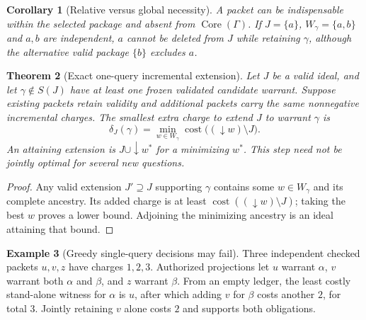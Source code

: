 \documentclass[10pt,letterpaper]{article}
\newtheorem{theorem}{Theorem}[section]
\newtheorem{corollary}[theorem]{Corollary}
\theoremstyle{definition}
\newtheorem{example}[theorem]{Example}
\theoremstyle{remark}
\newcommand{\cost}{\operatorname{cost}}
\newcommand{\Core}{\operatorname{Core}}
\begin{document}
\begin{corollary}[Relative versus global necessity]
A packet can be indispensable within the selected package and absent from $\Core(\Gamma)$. If $J=\{a\}$, $W_\gamma=\{a,b\}$ and $a,b$ are independent, $a$ cannot be deleted from $J$ while retaining $\gamma$, although the alternative valid package $\{b\}$ excludes $a$.
\end{corollary}

\begin{theorem}[Exact one-query incremental extension]\label{thm:increment}
Let $J$ be a valid ideal, and let $\gamma\notin S(J)$ have at least one frozen validated candidate warrant. Suppose existing packets retain validity and additional packets carry the same nonnegative incremental charges. The smallest extra charge to extend $J$ to warrant $\gamma$ is
\begin{equation}\label{eq:increment}
\delta_J(\gamma)=\min_{w\in W_\gamma}\cost\bigl((\downarrow w)\setminus J\bigr).
\end{equation}
An attaining extension is $J\cup\downarrow w^*$ for a minimizing $w^*$. This step need not be jointly optimal for several new questions.
\end{theorem}
\begin{proof}
Any valid extension $J'\supseteq J$ supporting $\gamma$ contains some $w\in W_\gamma$ and its complete ancestry. Its added charge is at least $\cost((\downarrow w)\setminus J)$; taking the best $w$ proves a lower bound. Adjoining the minimizing ancestry is an ideal attaining that bound.\end{proof}

\begin{example}[Greedy single-query decisions may fail]
Three independent checked packets $u,v,z$ have charges $1,2,3$. Authorized projections let $u$ warrant $\alpha$, $v$ warrant both $\alpha$ and $\beta$, and $z$ warrant $\beta$. From an empty ledger, the least costly stand-alone witness for $\alpha$ is $u$, after which adding $v$ for $\beta$ costs another $2$, for total $3$. Jointly retaining $v$ alone costs $2$ and supports both obligations.\end{example}
\end{document}

